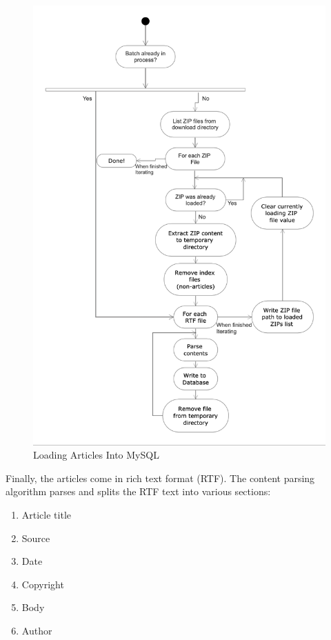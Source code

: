 \begin{figure}[h!]
      \centering
      \includegraphics[scale=0.7]{method/db_loader.png}
      \caption{Loading Articles Into MySQL}
      \label{database loader}
\end{figure}

Finally, the articles come in rich text format (RTF). The content parsing algorithm parses and splits the RTF text into various sections:
\begin{enumerate}
    \item Article title
    \item Source
    \item Date
    \item Copyright
    \item Body
    \item Author
\end{enumerate}

